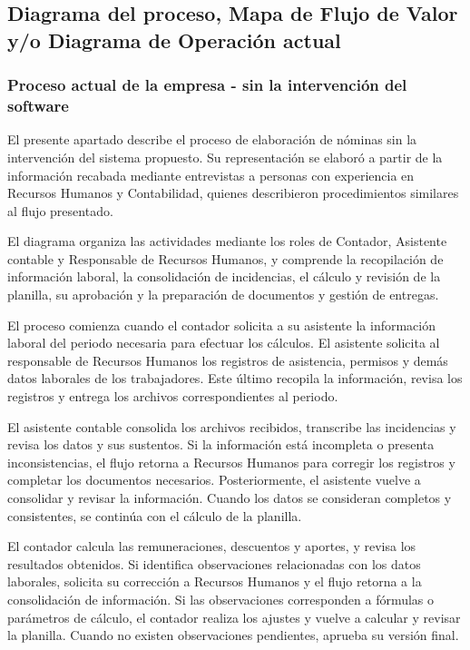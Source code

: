 \subsection{Diagrama del proceso, Mapa de Flujo de Valor y/o Diagrama de Operación actual}

\subsubsection{Proceso actual de la empresa - sin la intervención del software}

El presente apartado describe el proceso de elaboración de nóminas sin la intervención del sistema propuesto. 
Su representación se elaboró a partir de la información recabada mediante entrevistas a personas con experiencia en Recursos Humanos y Contabilidad, 
quienes describieron procedimientos similares al flujo presentado. 

El diagrama organiza las actividades mediante los roles de Contador, Asistente contable y Responsable de Recursos Humanos, 
y comprende la recopilación de información laboral, la consolidación de incidencias, 
el cálculo y revisión de la planilla, su aprobación y la preparación de documentos y gestión de entregas. 

El proceso comienza cuando el contador solicita a su asistente la información laboral del periodo necesaria para efectuar los cálculos. 
El asistente solicita al responsable de Recursos Humanos los registros de asistencia, permisos y demás datos laborales de los trabajadores. 
Este último recopila la información, revisa los registros y entrega los archivos correspondientes al periodo.

El asistente contable consolida los archivos recibidos, transcribe las incidencias y revisa los datos y sus sustentos. 
Si la información está incompleta o presenta inconsistencias, el flujo retorna a Recursos Humanos para corregir los registros y completar los documentos necesarios. 
Posteriormente, el asistente vuelve a consolidar y revisar la información. Cuando los datos se consideran completos y consistentes, se continúa con el cálculo de la planilla.

El contador calcula las remuneraciones, descuentos y aportes, y revisa los resultados obtenidos. 
Si identifica observaciones relacionadas con los datos laborales, solicita su corrección a Recursos Humanos y 
el flujo retorna a la consolidación de información. Si las observaciones corresponden a fórmulas o parámetros de cálculo, 
el contador realiza los ajustes y vuelve a calcular y revisar la planilla. Cuando no existen observaciones pendientes, aprueba su versión final.

